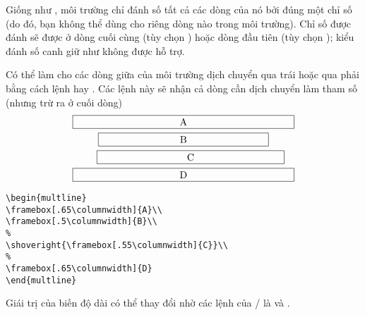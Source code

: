 \documentclass[11pt,leqno,titlepage,openany,oneside]{amsldoc}[1999/12/13]
\begin{document}
\medskip
Giống như , môi trường  chỉ đánh số tất cả
các dòng của nó bởi đúng một chỉ số (do đó, bạn không thể dùng 
cho riêng dòng nào trong môi trường). Chỉ số được đánh sẽ được ở dòng
cuối cùng (tùy chọn ) hoặc dòng đầu tiên (tùy chọn );
kiểu đánh số canh giữ như  không được hỗ trợ.

\medskip
Có thể làm cho các dòng giữa của môi trường dịch chuyển qua trái hoặc
qua phải bằng cách lệnh  hay .
Các lệnh này sẽ nhận cả dòng cần dịch chuyển làm tham số
(nhưng trừ ra \cn{\\} ở cuối dòng)
\begin{multline}
\framebox[.65\columnwidth]{A}\\
\framebox[.5\columnwidth]{B}\\
\shoveright{\framebox[.55\columnwidth]{C}}\\
\framebox[.65\columnwidth]{D}
\end{multline}
\begin{verbatim}
\begin{multline}
\framebox[.65\columnwidth]{A}\\
\framebox[.5\columnwidth]{B}\\
%
\shoveright{\framebox[.55\columnwidth]{C}}\\
%
\framebox[.65\columnwidth]{D}
\end{multline}
\end{verbatim}

Giái trị của biến độ dài  có thể thay đổi nhờ các
lệnh của \latex/ là  và .

\end{document}
